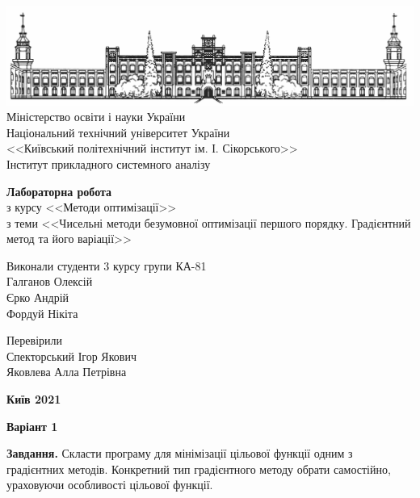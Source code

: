 \documentclass{extreport}
\begin{document}
\begin{titlepage}
    \thispagestyle{empty}
    \begin{center}
        \includegraphics[width = \textwidth]{kpi}
        Міністерство освіти і науки України\\
        Національний технічний університет України\\
        <<Київський політехнічний інститут ім. І. Сікорського>>\\
        Інститут прикладного системного аналізу
    \end{center}
    \vspace{40mm}
    \begin{center}
        \textbf{Лабораторна робота} \\
        з курсу <<Методи оптимізації>> \\
        з теми <<Чисельні методи безумовної оптимізації першого порядку. 
        Градієнтний метод та його варіації>>
    \end{center}
    \vspace{20mm}
    \begin{flushleft}
        Виконали студенти 3 курсу групи КА-81 \\
        Галганов Олексій \\
        Єрко Андрій \\
        Фордуй Нікіта
    \end{flushleft}
    \begin{flushright}
        Перевірили \\
        Спекторський Ігор Якович \\
        Яковлева Алла Петрівна
    \end{flushright}
    \vspace{30mm}
    \begin{center}
        \textbf{Київ 2021}
    \end{center}
\end{titlepage}

\begin{center}
    \textbf{Варіант 1}
\end{center}
\textbf{Завдання.} Скласти програму для мінімізації цільової функції
одним з градієнтних методів. Конкретний тип градієнтного методу обрати
самостійно, ураховуючи особливості цільової функції.
\end{document}
